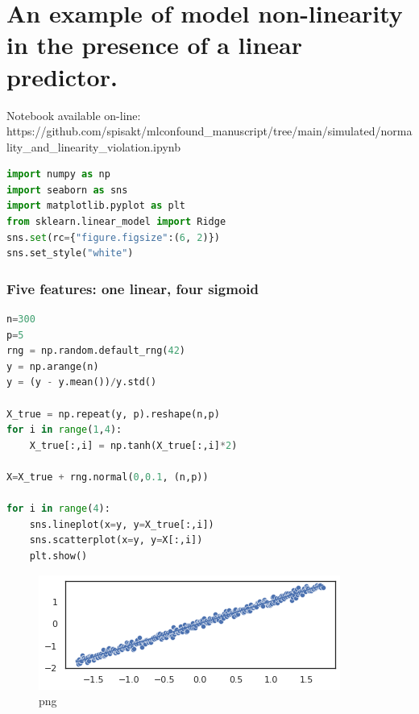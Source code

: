 \hypertarget{an-example-of-model-non-linearity-in-the-presence-of-a-linear-predictor.}{%
\section{An example of model non-linearity in the presence of a linear
predictor.}\label{an-example-of-model-non-linearity-in-the-presence-of-a-linear-predictor.}}

Notebook available on-line:
https://github.com/spisakt/mlconfound\_manuscript/tree/main/simulated/normality\_and\_linearity\_violation.ipynb

\begin{lstlisting}[language=Python]
import numpy as np
import seaborn as sns
import matplotlib.pyplot as plt
from sklearn.linear_model import Ridge
sns.set(rc={"figure.figsize":(6, 2)})
sns.set_style("white")
\end{lstlisting}

\hypertarget{five-features-one-linear-four-sigmoid}{%
\subsubsection{Five features: one linear, four
sigmoid}\label{five-features-one-linear-four-sigmoid}}

\begin{lstlisting}[language=Python]
n=300
p=5
rng = np.random.default_rng(42)
y = np.arange(n)
y = (y - y.mean())/y.std()

X_true = np.repeat(y, p).reshape(n,p)
for i in range(1,4):
    X_true[:,i] = np.tanh(X_true[:,i]*2)

X=X_true + rng.normal(0,0.1, (n,p))

for i in range(4):
    sns.lineplot(x=y, y=X_true[:,i])
    sns.scatterplot(x=y, y=X[:,i])
    plt.show()
\end{lstlisting}

\begin{figure}
\centering
\includegraphics{fig/normality_and_linearity_violation_files/normality_and_linearity_violation_3_0.png}
\caption{png}
\end{figure}

